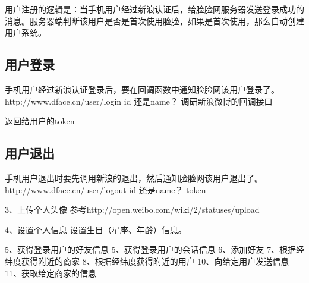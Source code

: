\documentclass{article}
\begin{document}
\begin{CJK}{UTF8}{gbsn}
用户注册的逻辑是：当手机用户经过新浪认证后，给脸脸网服务器发送登录成功的消息。服务器端判断该用户是否是首次使用脸脸，如果是首次使用，那么自动创建用户系统。

\subsection{用户登录}
手机用户经过新浪认证登录后，要在回调函数中通知脸脸网该用户登录了。
http://www.dface.cn/user/login
id 还是name？ 调研新浪微博的回调接口

返回给用户的token


\subsection{用户退出}
手机用户退出时要先调用新浪的退出，然后通知脸脸网该用户退出了。
http://www.dface.cn/user/logout
id 还是name？
token


3、上传个人头像
参考http://open.weibo.com/wiki/2/statuses/upload


4、设置个人信息
设置生日（星座、年龄）信息。


5、获得登录用户的好友信息
5、获得登录用户的会话信息
6、添加好友
7、根据经纬度获得附近的商家
8、根据经纬度获得附近的用户
10、向给定用户发送信息
11、获取给定商家的信息


\newpage

\end{CJK}
\end{document}
